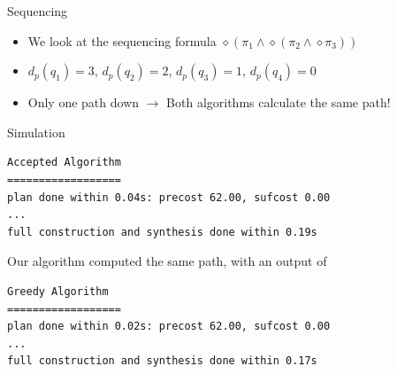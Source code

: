 \documentclass{beamer}
\begin{document}
\begin{frame}{Sequencing}
\begin{itemize}
	\item {
	We look at the sequencing formula $\diamond (\pi_1 \land \diamond(\pi_2 \land \diamond \pi_3))$
	}
\end{itemize}
\begin{figure}
\centering
{}
\end{figure}

\begin{itemize}
	\item {
	$d_p(q_1)=3$, $d_p(q_2)=2$, $d_p(q_3)=1$, $d_p(q_4)=0$
	}	
	\item {
	Only one path down $\rightarrow$ Both algorithms calculate the same path!
	}
\end{itemize}
\end{frame}

\begin{frame}[fragile]{Simulation}
\begingroup
\fontsize{9pt}{12pt}\selectfont
\begin{lstlisting}
Accepted Algorithm
==================
plan done within 0.04s: precost 62.00, sufcost 0.00
...
full construction and synthesis done within 0.19s 
\end{lstlisting}
\endgroup
Our algorithm computed the same path, with an output of

\begingroup
\fontsize{9pt}{12pt}\selectfont
\begin{lstlisting}
Greedy Algorithm
==================
plan done within 0.02s: precost 62.00, sufcost 0.00
...
full construction and synthesis done within 0.17s 
\end{lstlisting}
\endgroup
\end{frame}
\end{document}

